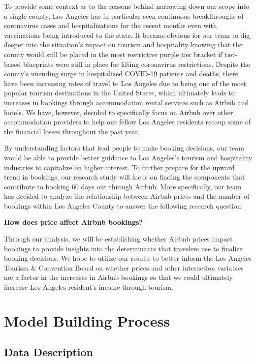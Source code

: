\documentclass[
]{article}
\begin{document}
To provide some context as to the reasons behind narrowing down our scope into a single county, Los Angeles has in particular seen continuous breakthroughs of coronavirus cases and hospitalizations for the recent months even with vaccinations being introduced to the state. It became obvious for our team to dig deeper into the situation's impact on tourism and hospitality knowing that the county would still be placed in the most restrictive purple tier bracket if tier-based blueprints were still in place for lifting coronavirus restrictions. Despite the county's unending surge in hospitalized COVID-19 patients and deaths, there have been increasing rates of travel to Los Angeles due to being one of the most popular tourism destinations in the United States, which ultimately leads to increases in bookings through accommodation rental services such as Airbnb and hotels. We have, however, decided to specifically focus on Airbnb over other accommodation providers to help our fellow Los Angeles residents recoup some of the financial losses throughout the past year.

By understanding factors that lead people to make booking decisions, our team would be able to provide better guidance to Los Angeles's tourism and hospitality industries to capitalize on higher interest. To further prepare for the upward trend in bookings, our research study will focus on finding the components that contribute to booking 60 days out through Airbnb. More specifically, our team has decided to analyze the relationship between Airbnb prices and the number of bookings within Los Angeles County to answer the following research question:

\textbf{How does price affect Airbnb bookings?}

Through our analysis, we will be establishing whether Airbnb prices impact bookings to provide insights into the determinants that travelers use to finalize booking decisions. We hope to utilize our results to better inform the Los Angeles Tourism \& Convention Board on whether prices and other interaction variables are a factor in the increases in Airbnb bookings so that we could ultimately increase Los Angeles resident's income through tourism.

\hypertarget{model-building-process}{%
\section{Model Building Process}\label{model-building-process}}

\hypertarget{data-description}{%
\subsection{Data Description}\label{data-description}}
\end{document}
